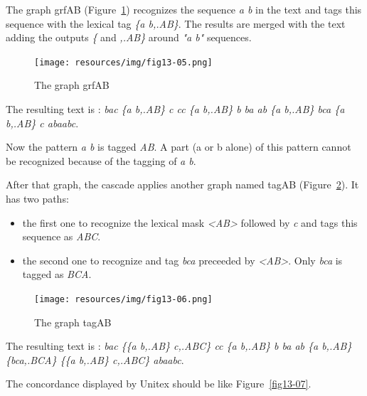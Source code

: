 \bigskip
\noindent The graph grfAB (Figure~\ref{fig13-05}) recognizes the sequence \emph{a b} in the text and tags this sequence with the lexical tag \textit{\{a b,.AB\}}. The results are merged with the text adding the outputs \emph{\{ }and \emph{,.AB\}} around \textit{"a b"} sequences. 

\begin{figure}[!htb]
  \centering
  \texttt{[image: resources/img/fig13-05.png]}
  \caption{The graph grfAB}
  \label{fig13-05}
\end{figure}

\bigskip
\noindent The resulting text is : \emph{bac \{a b,.AB\} c cc \{a b,.AB\} b ba ab \{a b,.AB\} bca \{a b,.AB\} c abaabc}.

\bigskip
\noindent Now the pattern \emph{a b} is tagged \emph{AB}. A part (a or b alone) of this pattern cannot be recognized because of the tagging of \emph{a b}. 

\bigskip
\noindent After that graph, the cascade applies another graph named tagAB (Figure~\ref{fig13-06}). It has two paths: 
\begin{itemize}
	\item the first one to recognize the lexical mask \textit{<AB>} followed by \textit{c} and tags this sequence as \textit{ABC}.
  \item the second one to recognize and tag \textit{bca} preceeded by \textit{<AB>}. Only \textit{bca} is tagged as \textit{BCA}.
\end{itemize}

\begin{figure}[!htb]
  \centering
  \texttt{[image: resources/img/fig13-06.png]}
  \caption{The graph tagAB}
  \label{fig13-06}
\end{figure}

\bigskip
\noindent The resulting text is : \emph{bac \{\{a b,.AB\} c,.ABC\} cc \{a b,.AB\} b ba ab \{a b,.AB\} \{bca,.BCA\} \{\{a b,.AB\} c,.ABC\} abaabc}.


\bigskip
\noindent The concordance displayed by Unitex should be like Figure~\ref{fig13-07}.

